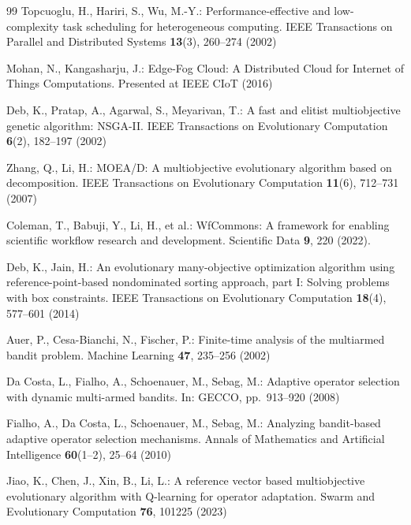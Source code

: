 \documentclass[preprint,12pt]{elsarticle}
\begin{document}
\begin{thebibliography}{99}
\footnotesize
\setlength{\itemsep}{0pt}
\setlength{\parskip}{0pt}
\setlength{\parsep}{0pt}
Topcuoglu, H., Hariri, S., Wu, M.-Y.: Performance-effective and low-complexity task scheduling for heterogeneous computing. IEEE Transactions on Parallel and Distributed Systems \textbf{13}(3), 260--274 (2002)

Mohan, N., Kangasharju, J.: Edge-Fog Cloud: A Distributed Cloud for Internet of Things Computations. Presented at IEEE CIoT (2016)

Deb, K., Pratap, A., Agarwal, S., Meyarivan, T.: A fast and elitist multiobjective genetic algorithm: NSGA-II. IEEE Transactions on Evolutionary Computation \textbf{6}(2), 182--197 (2002)

Zhang, Q., Li, H.: MOEA/D: A multiobjective evolutionary algorithm based on decomposition. IEEE Transactions on Evolutionary Computation \textbf{11}(6), 712--731 (2007)

Coleman, T., Babuji, Y., Li, H., et al.: WfCommons: A framework for enabling scientific workflow research and development. Scientific Data \textbf{9}, 220 (2022).

Deb, K., Jain, H.: An evolutionary many-objective optimization algorithm using reference-point-based nondominated sorting approach, part I: Solving problems with box constraints. IEEE Transactions on Evolutionary Computation \textbf{18}(4), 577--601 (2014)

Auer, P., Cesa-Bianchi, N., Fischer, P.: Finite-time analysis of the multiarmed bandit problem. Machine Learning \textbf{47}, 235--256 (2002)

Da Costa, L., Fialho, A., Schoenauer, M., Sebag, M.: Adaptive operator selection with dynamic multi-armed bandits. In: GECCO, pp.~913--920 (2008)

Fialho, A., Da Costa, L., Schoenauer, M., Sebag, M.: Analyzing bandit-based adaptive operator selection mechanisms. Annals of Mathematics and Artificial Intelligence \textbf{60}(1--2), 25--64 (2010)

Jiao, K., Chen, J., Xin, B., Li, L.: A reference vector based multiobjective evolutionary algorithm with Q-learning for operator adaptation. Swarm and Evolutionary Computation \textbf{76}, 101225 (2023)


\end{thebibliography}
\end{document}
